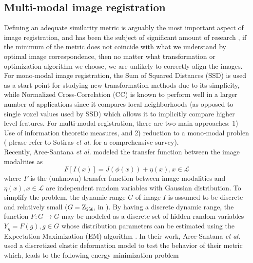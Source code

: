 \subsection{Multi-modal image registration}

Defining an adequate similarity metric is arguably the most important aspect of image registration, and has been the subject of significant amount of research \cite{Sotiras2013}, if
the minimum of the metric does not coincide with what we understand by optimal image correspondence, then no matter what transformation or optimization algorithm we choose, we are
unlikely to correctly align the images. For mono-modal image registration, the Sum of Squared Distances (SSD) is used as a start point for studying new transformation methods due to
its simplicity, while Normalized Cross-Correlation (CC) is known to perform well in a larger number of applications since it compares local neighborhoods (as opposed to single
voxel values used by SSD) which allows it to implicitly compare higher level features. For multi-modal registration, there are two main approaches: 1) Use of information theoretic
measures, and 2) reduction to a mono-modal problen ( please refer to Sotiras {\it et al.} \cite{Sotiras2013} for a comprehensive survey).\\

Recently, Arce-Santana {\it et al.} \cite{Arce-santana2014} modeled the transfer function between the image modalities as
\begin{equation}\label{eq:arce_model}
    F[I(x)] = J(\phi(x)) + \eta(x), x\in \mathcal{L}
\end{equation}
where $F$ is the (unknown) transfer function between image modalities and $\eta(x), x\in \mathcal{L}$ are independent random variables with Gaussian distribution. To simplify
the problem, the dynamic range $G$ of image $I$ is assumed to be discrete and relatively small ($G = \mathrm{Z}_{256}$, in \cite{Arce-santana2014}). By having a discrete
dynamic range, the function $F: G \rightarrow G$ may be modeled as a discrete set of hidden random variables $Y_g = F(g), g\in G$ whose distribution parameters
can be estimated using the Expectation Maximization (EM) algorithm \cite{Dempster1977}. In their work, Arce-Santana {\it et al.} \cite{Arce-santana2014} used a discretized elastic
deformation model to test the behavior of their metric which, leads to the following energy minimization problem

